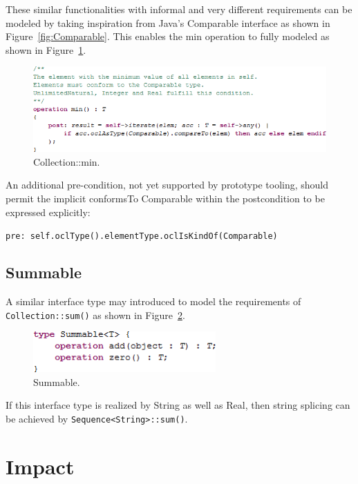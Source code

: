 \documentclass{eceasst}
\begin{document}
These similar functionalities with informal and very different requirements can be modeled by taking inspiration from Java's Comparable interface as shown in Figure~\ref{fig:Comparable}. This enables the min operation to fully modeled as shown in Figure~\ref{fig:Collection_min}.

\begin{figure}
  \begin{center}
    \includegraphics[width=5.75in]{Collection_min.png}
  \end{center}
  \caption{Collection::min.}
  \label{fig:Collection_min}
\end{figure}

An additional pre-condition, not yet supported by prototype tooling, should permit the implicit conformsTo Comparable within the postcondition to be expressed explicitly:

\verb|pre: self.oclType().elementType.oclIsKindOf(Comparable)|

\subsection{Summable}

A similar interface type may introduced to model the requirements of \verb|Collection::sum()| as shown in Figure~\ref{fig:Summable}.

\begin{figure}
  \begin{center}
    \includegraphics[width=2.75in]{Summable.png}
  \end{center}
  \caption{Summable.}
  \label{fig:Summable}
\end{figure}

If this interface type is realized by String as well as Real, then string splicing can be achieved by \verb|Sequence<String>::sum()|.

\section{Impact}
\end{document}
